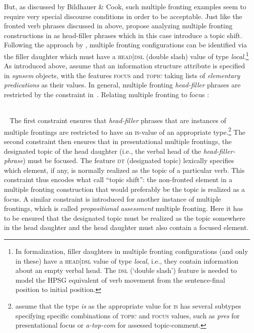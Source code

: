\documentclass[output=paper
 	        ,biblatex
                ,babelshorthands
                ,newtxmath
                ,draftmode
                ,colorlinks, citecolor=brown
]{langscibook}
\begin{document}
But, as discussed by Bildhauer \& Cook, such multiple fronting
examples seem to require very special discourse conditions in order to
be acceptable. Just like the fronted verb phrases discussed in
\cite{dKM2003a} above, \cite{BC2010a} propose
analyzing multiple fronting constructions in  as head-filler
phrases which in this case introduce a topic shift. Following the
approach by \cite{Mueller2005d}, multiple fronting
configurations can be identified via the filler daughter which must
have a \textsc{head|dsl} (double slash) value of type
\textit{local}.\footnote{In  formalization, filler daughters in multiple fronting configurations (and only in these) have a  \textsc{head|dsl} value of type \textit{local}, i.e., they contain information about an empty verbal head. The \textsc{dsl} (‘double slash’) feature is needed to model the HPSG equivalent of verb movement from the sentence-final position to initial position. } As introduced above, \cite{BC2010a} assume that an
information structure attribute is specified in \textit{synsem}
objects, with the features \textsc{focus} and \textsc{topic} taking
lists of \textit{elementary predications} as their values. In general,
multiple fronting \textit{head-filler} phrases are restricted by the
constraint in~.
\ea
Relating multiple fronting to focus \citep[75]{BC2010a}:\\
\impl\ 

\bigskip
\impl\ 
  \avm{
    [ss|loc|cat|head|dt & <[loc|cont|rels \1]>\\
      hd-dtr|ss|is|focus & <\1>]
  }
  \label{fig:multiplefronting}
\z
The first constraint ensures that \textit{head-filler} phrases that
are instances of multiple frontings are restricted to have an
\textsc{is}-value of an appropriate type.\footnote{\cite[75]{BC2010a}
  assume that the type \textit{is} as the appropriate value for
  \textsc{is} has several subtypes specifying specific combinations of
  \textsc{topic} and \textsc{focus} values, such as \textit{pres} for
  presentational focus or \textit{a-top-com} for
  assessed topic-comment.} The second constraint then ensures that in
presentational multiple frontings, the designated topic of the head
daughter (i.e., the verbal head of the \textit{head-filler-phrase})
must be focused. The feature \textsc{dt} (designated topic) lexically specifies which
element, if any, is normally realized as the topic of a particular
verb. This constraint thus encodes what \cite{BC2010a} call ``topic
shift'': the non-fronted element in a multiple fronting construction
that would preferably be the topic is realized as a focus. A similar
constraint is introduced for another instance of multiple frontings,
which is called \textit{propositional assessment} multiple
fronting. Here it has to be ensured that the designated topic must be
realized as the topic somewhere in the head daughter and the
head daughter must also contain a focused element.
\end{document}
